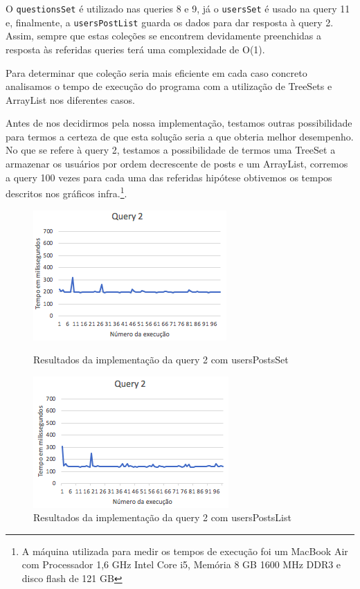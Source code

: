 \documentclass[a4paper]{article}
\begin{document}
O \texttt{questionsSet} é utilizado nas queries 8 e 9, já o \texttt{usersSet} é
usado na query 11 e, finalmente, a \texttt{usersPostList} guarda os dados para dar
resposta à query 2.
Assim, sempre que estas coleções se encontrem devidamente preenchidas
a resposta às referidas queries terá uma complexidade de O(1). \par
Para determinar que coleção seria mais eficiente em cada caso concreto analisamos
o tempo de execução do programa com a utilização de TreeSets e ArrayList nos diferentes
casos. \par
Antes de nos decidirmos pela nossa implementação, testamos outras possibilidade
para termos a certeza de que esta solução seria a que obteria melhor desempenho.
No que se refere à query 2, testamos a possibilidade de termos uma TreeSet a armazenar
os usuários por ordem decrescente de posts e um ArrayList, corremos a query 100 vezes
para cada uma das referidas hipótese obtivemos os tempos descritos nos gráficos
infra.\footnote{A máquina utilizada para medir os tempos de execução foi um
MacBook Air com Processador 1,6 GHz Intel Core i5, Memória 8 GB 1600 MHz DDR3 e
disco flash de 121 GB}.

\begin{figure}[H]
    \centering
    \begin{minipage}[b]{0.4\textwidth}
    \includegraphics[scale=0.7]{imgs/Query2_Set}
    \caption{Resultados da implementação da query 2 com usersPostsSet}
    \label{figRotulo}
  \end{minipage}
 \hfill
   \begin{minipage}[b]{0.5\textwidth}
      \includegraphics[scale=0.7]{imgs/Query2_List}
      \caption{Resultados da implementação da query 2 com usersPostsList}
      \label{figRotulo}
      \end{minipage}
    \end{figure}
\end{document}
